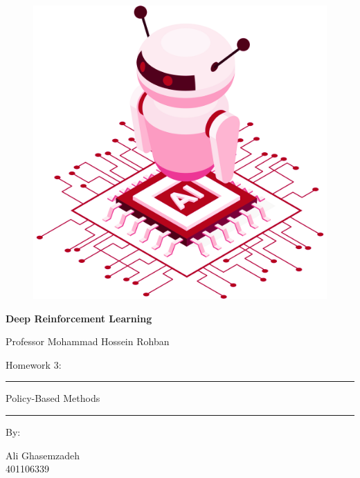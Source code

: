 \documentclass[12pt]{article}
\begin{document}
	
	\thispagestyle{plain}
	
	\begin{center}
		
		\vspace*{-1.5cm}
		\begin{figure}[!h]
			\centering
			\includegraphics[width=0.7\linewidth]{figs/cover-std.png}
		\end{figure}
		
		{
			
			{\color{DarkBlue} {\fontsize{30}{50} \textbf{
						Deep Reinforcement Learning
			}}}
			
			{\color{DarkBlue} {\Large
					Professor Mohammad Hossein Rohban
			}}
		}
		
		
		\vspace{20pt}
		
		{
			
			
			{\color{RedOrange}
				{\Large
					Homework 3:
				}\\
			}
			{\color{BrickRed}
				\rule{12cm}{0.5pt}
				
				{\Huge
					Policy-Based Methods
				}
				\rule{12cm}{0.5pt}
			}
			
			\vspace{10pt}
			
			{\color{RoyalPurple} { \small By:} } \\
			\vspace{10pt}
			
			{\color{Blue} { \LARGE Ali Ghasemzadeh } } \\
			\vspace{5pt}
			{\color{RoyalBlue} { \Large 401106339 } }
			
}
\end{center}
\end{document}

